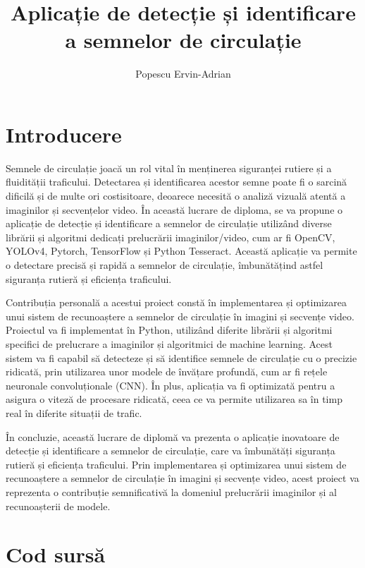 \documentclass[12pt, a4paper, twoside, romanian]{teza-etti}
\author{Popescu Ervin-Adrian}
\title{Aplicație de detecție și identificare a semnelor de circulație}
\begin{document}
\beforepreface{}
\listoffigures
\listoftables
{}
\afterpreface{}


\chapter{Introducere}
Semnele de circulație joacă un rol vital în menținerea siguranței rutiere și a fluidității traficului.
Detectarea și identificarea acestor semne poate fi o sarcină dificilă și de multe ori costisitoare,
deoarece necesită o analiză vizuală atentă a imaginilor și secvențelor video.
În această lucrare de diploma, se va propune o aplicație de detecție și identificare a semnelor de circulație utilizând diverse librării și algoritmi dedicați prelucrării imaginilor/video, cum ar fi OpenCV, YOLOv4, Pytorch, TensorFlow și Python Tesseract. Această aplicație va permite o detectare precisă și rapidă a semnelor de circulație, îmbunătățind astfel siguranța rutieră și eficiența traficului.

Contribuția personală a acestui proiect constă în implementarea și optimizarea unui sistem de recunoaștere a semnelor de circulație în imagini și secvențe video. Proiectul va fi implementat în Python, utilizând diferite librării și algoritmi specifici de prelucrare a imaginilor și algoritmici de machine learning. Acest sistem va fi capabil să detecteze și să identifice semnele de circulație cu o precizie ridicată, prin utilizarea unor modele de învățare profundă, cum ar fi rețele neuronale convoluționale (CNN). În plus, aplicația va fi optimizată pentru a asigura o viteză de procesare ridicată, ceea ce va permite utilizarea sa în timp real în diferite situații de trafic.

În concluzie, această lucrare de diplomă va prezenta o aplicație inovatoare de detecție și identificare a semnelor de circulație, care va îmbunătăți siguranța rutieră și eficiența traficului. Prin implementarea și optimizarea unui sistem de recunoaștere a semnelor de circulație în imagini și secvențe video, acest proiect va reprezenta o contribuție semnificativă la domeniul prelucrării imaginilor și al recunoașterii de modele.
% 
% 
\appendix
\chapter{Cod sursă}



% 
% 
% 
\end{document}
